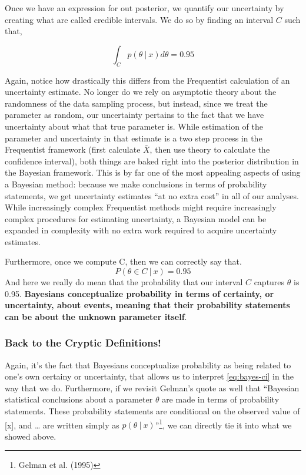 \documentclass[12pt,twoside]{reedthesis}
\begin{document}
Once we have an expression for out posterior, we quantify our uncertainty by creating what are called credible intervals. We do so by finding an interval \(C\) such that,

\[
\int_C p(\theta \ | \ x)d\theta = 0.95
\]

Again, notice how drastically this differs from the Frequentist calculation of an uncertainty estimate. No longer do we rely on asymptotic theory about the randomness of the data sampling process, but instead, since we treat the parameter as random, our uncertainty pertains to the fact that we have uncertainty about what that true parameter is. While estimation of the parameter and uncertainty in that estimate is a two step process in the Frequentist framework (first calculate \(\bar{X}\), then use theory to calculate the confidence interval), both things are baked right into the posterior distribution in the Bayesian framework. This is by far one of the most appealing aspects of using a Bayesian method: because we make conclusions in terms of probability statements, we get uncertainty estimates ``at no extra cost'' in all of our analyses. While increasingly complex Frequentist methods might require increasingly complex procedures for estimating uncertainty, a Bayesian model can be expanded in complexity with no extra work required to acquire uncertainty estimates.

Furthermore, once we compute C, then we can correctly say that.
\begin{equation}
  P(\theta \in C \ | \ x) = 0.95
  \label{eq:bayes-ci}
\end{equation}
And here we really do mean that the probability that our interval \(C\) captures \(\theta\) is 0.95. \textbf{Bayesians conceptualize probability in terms of certainty, or uncertainty, about events, meaning that their probability statements can be about the unknown parameter itself}.

\hypertarget{back-to-the-cryptic-definitions}{%
\subsubsection{Back to the Cryptic Definitions!}\label{back-to-the-cryptic-definitions}}

Again, it's the fact that Bayesians conceptualize probability as being related to one's own certainy or uncertainty, that allows us to interpret \eqref{eq:bayes-ci} in the way that we do. Furthermore, if we revisit Gelman's quote as well that ``Bayesian statistical conclusions about a parameter \(\theta\) are made in terms of probability statements. These probability statements are conditional on the observed value of {[}x{]}, and \ldots{} are written simply as \(p(\theta \ | \ x)\)''\footnote{Gelman et al. (1995)}, we can directly tie it into what we showed above.
\end{document}

